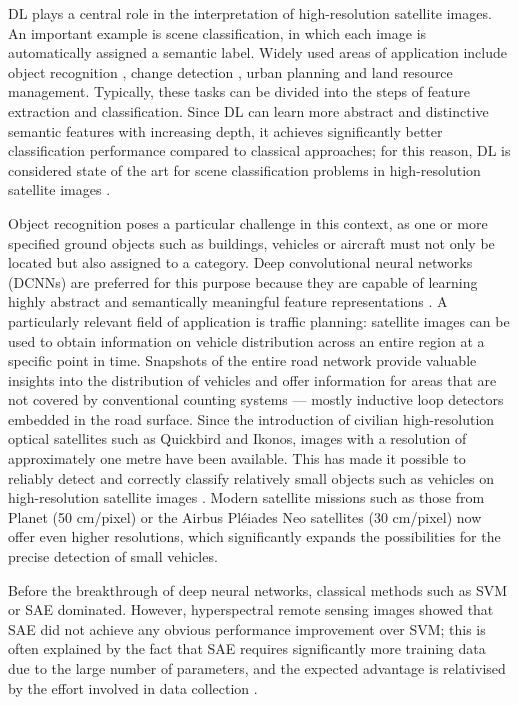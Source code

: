 \Acrlong{DL} plays a central role in the interpretation of high-resolution satellite images. An important example is scene classification, in which each image is automatically assigned a semantic label. Widely used areas of application include object recognition \cite{Bhagavathy2006,Cheng2016}, change detection \cite{Chen2006}, urban planning and land resource management. Typically, these tasks can be divided into the steps of feature extraction and classification. Since \Acrlong{DL} can learn more abstract and distinctive semantic features with increasing depth, it achieves significantly better classification performance compared to classical approaches; for this reason, \Acrlong{DL} is considered state of the art for scene classification problems in high-resolution satellite images \cite{Zhu2017}.

Object recognition poses a particular challenge in this context, as one or more specified ground objects such as buildings, vehicles or aircraft must not only be located but also assigned to a category. Deep convolutional neural networks (DCNNs) are preferred for this purpose because they are capable of learning highly abstract and semantically meaningful feature representations \cite{Zhu2017}. A particularly relevant field of application is traffic planning: satellite images can be used to obtain information on vehicle distribution across an entire region at a specific point in time. Snapshots of the entire road network provide valuable insights into the distribution of vehicles and offer information for areas that are not covered by conventional counting systems — mostly inductive loop detectors embedded in the road surface. Since the introduction of civilian high-resolution optical satellites such as Quickbird and Ikonos, images with a resolution of approximately one metre have been available. This has made it possible to reliably detect and correctly classify relatively small objects such as vehicles on high-resolution satellite images \cite{Eikvil2009}. Modern satellite missions such as those from Planet (50 cm/pixel) \cite{planet_labs} or the Airbus Pléiades Neo satellites (30 cm/pixel) \cite{airbus_neo} now offer even higher resolutions, which significantly expands the possibilities for the precise detection of small vehicles.

Before the breakthrough of deep neural networks, classical methods such as \Acrfull{SVM} or \Acrfull{SAE} dominated. However, hyperspectral remote sensing images showed that \Acrshort{SAE} did not achieve any obvious performance improvement over \Acrshort{SVM}; this is often explained by the fact that \acrshort{SAE} requires significantly more training data due to the large number of parameters, and the expected advantage is relativised by the effort involved in data collection \cite{Liu2017}.

